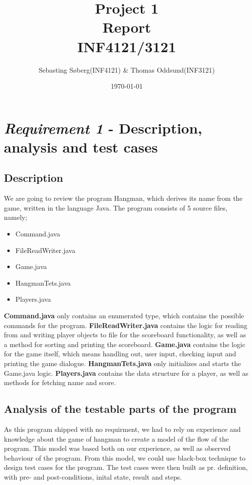 \documentclass{article}
\title{Project 1 \\ Report \\ INF4121/3121} %
\date{\today} %
\author{Sebasting Søberg(INF4121) \& Thomas Oddsund(INF3121)}
\begin{document}
\maketitle %

\section{\textit{Requirement 1} - Description, analysis and test cases}

	\subsection{Description}
	We are going to review the program Hangman, which derives its name from the game, written in the language Java. The program consists of 5 source files, namely;
	\begin{itemize}
	\item Command.java
	\item FileReadWriter.java
	\item Game.java
	\item HangmanTets.java
	\item Players.java
	\end{itemize}

	\textbf{Command.java} only contains an enumerated type, which contains the possible commands for the program. \textbf{FileReadWriter.java} contains the logic for reading from and writing player objects to file for the scoreboard functionality, as well as a method for sorting and printing the scoreboard. \textbf{Game.java} contains the logic for the game itself, which means handling out, user input, checking input and printing the game dialogue. \textbf{HangmanTets.java} only initializes and starts the Game.java logic. \textbf{Players.java} contains the data structure for a player, as well as methods for fetching name and score.

	\subsection{Analysis of the testable parts of the program}
	As this program shipped with no requirment, we had to rely on experience and knowledge about the game of hangman to create a model of the flow of the program. This model was based both on our experience, as well as observed behaviour of the program. From this model, we could use black-box technique to design test cases for the program. The test cases were then built as pr. definition, with pre- and post-conditions, inital state, result and steps.
	
\end{document}
